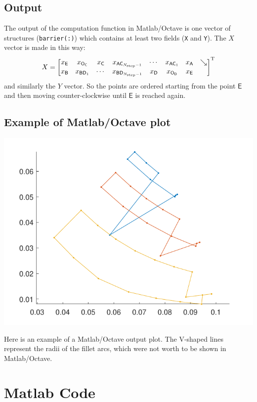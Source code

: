 \documentclass[b5paper,11pt,oneside,fleqn]{article}
\newcommand{\ap}[1]{^\textup{#1}}
\newcommand{\pt}[1]{\mathsf{#1}}
\newcommand{\Nstep}{N_{\textup{step}}}
\begin{document}
\subsection{Output}

The output of the computation function in Matlab/Octave is one vector of 
structures (\texttt{barrier(:)}) which contains at least two fields (\texttt{X} 
and \texttt{Y}).
%
The $ X $ vector is made in this way:
\[
X = 
\begin{bmatrix}
x_\pt{E} &
x_{\pt{O}_{\pt{C}}} & 
x_\pt{C} &
%
x_{\pt{AC}_{\Nstep-1}} &
\cdots &
x_{\pt{AC}_1} &
x_\pt{A} &
\searrow \\
%
x_\pt{B} & 
x_{\pt{BD}_1} &
\cdots &
x_{\pt{BD}_{\Nstep-1}} &
%
x_\pt{D} &
x_{\pt{O}_{\pt{D}}} & 
x_\pt{E} 
\end{bmatrix}\ap{T}
\]
and similarly the $ Y $ vector. So the points are ordered starting from the 
point $ \pt{E} $ and then moving counter-clockwise until $ \pt{E} $ is reached 
again.





\subsection{Example of Matlab/Octave plot}

\includegraphics[width=0.75\linewidth]{gfx/MatlabOutput}

Here is an example of a Matlab/Octave output plot.
The V-shaped lines represent the radii of the fillet arcs, which were not worth 
to be shown in Matlab/Octave.




\clearpage
\section{Matlab Code}
\end{document}
